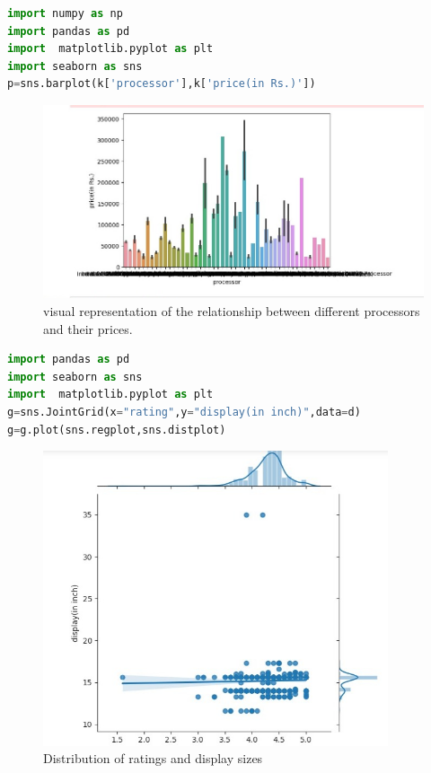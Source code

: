 \begin{lstlisting}[language=Python]
import numpy as np
import pandas as pd
import  matplotlib.pyplot as plt
import seaborn as sns
p=sns.barplot(k['processor'],k['price(in Rs.)'])
\end{lstlisting}
 \begin{figure}[h]
\centering
 \footnotesize
 \includegraphics[width=6in]{3.png}
\caption{visual representation of the relationship between different processors and their prices.}
\label{fig:dunnhalftone}
\end{figure}
\begin{lstlisting}[language=Python]
import pandas as pd
import seaborn as sns
import  matplotlib.pyplot as plt
g=sns.JointGrid(x="rating",y="display(in inch)",data=d)
g=g.plot(sns.regplot,sns.distplot)
\end{lstlisting}
 \begin{figure}[h]
\centering
 \footnotesize
 \includegraphics[width=4in]{4.png}
\caption{Distribution of ratings and display sizes}
\label{fig:dunnhalftone}
\end{figure} 


